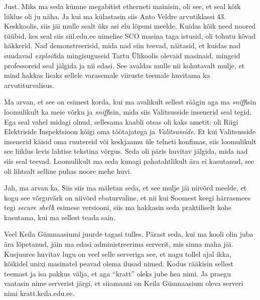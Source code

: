
Just. Miks ma seda kümne megabitist etherneti mainisin, oli see, et seal kõik liiklus oli ju näha. Ja kui ma külastasin siis Anto Veldre arvutiklassi 43. Keskkoolis, siis jäi mulle sealt üks asi elu lõpuni meelde. Kuidas kõik need noored tüübid, kes seal siis siil.edu.ee nimelise SCO masina taga istusid, oli tohutu kõvad häkkerid. Nad demonstreerisid, mida nad siin teevad, näitasid, et kuidas nad  suudavad \emph{exploit}ida mingisuguseid Tartu Ülikoolis olevaid masinaid, mingeid professoreid seal jälgida ja nii edasi. See avaldas mulle nii kohutavalt mulje, et mind hakkas lisaks sellele varasemale viiruste teemale huvitama ka arvutiturvalisus.

Ma arvan, et see on esimest korda, kui ma avalikult sellest räägin aga ma \emph{sniff}isin loomulikult ka meie  võrku ja \emph{sniff}isin, mida siis Valitsusside insenerid seal tegid. Ega seal vahel midagi olnud,  sellesama  kaabli otsas oli kaks ametit: oli Riigi Elektriside Inspektsioon kõigi oma töötajatega ja \emph{Valitsusside}. Et kui Valitsusside insenerid käisid oma ruutereid või keskjaamu üle telneti konfimas, siis loomulikult see liiklus levis lahtise tekstina võrgus. Seda oli päris huvitav jälgida, mida nad siis seal teevad.  Loomulikult ma seda kunagi pahatahtlikult ära ei kasutanud, see oli lihtsalt selline puhas  noore mehe huvi.


Jah, ma arvan ka. Siis siis ma mäletan seda, et see mulje jäi niivõrd meelde, et kogu see võrguvärk on niivõrd ebaturvaline, et nii kui Soomest keegi härrasmees tegi \emph{secure shell}i esimese versiooni, siis ma hakkasin seda praktiliselt kohe kasutama, kui ma sellest teada sain. 

Veel Keila Gümnaasiumi juurde tagasi tulles. Pärast seda, kui ma kooli olin juba ära lõpetanud,  jäin ma edasi administreerima serverit, mis sinna maha jäi. Kusjuures huvitav lugu on veel selle serveriga see, et nagu tollel ajal ikka,  kõikidel unixi masinatel peavad olema ilusad nimed. Kodus rääkisin sellest teemast ja isa pakkus välja, et aga \enquote{kratt} oleks jube hea nimi. Ja praegu vaatasin nime serverist järgi, et siiamaani on Keila Gümnaasium oleva serveri nimi kratt.keila.edu.ee.

